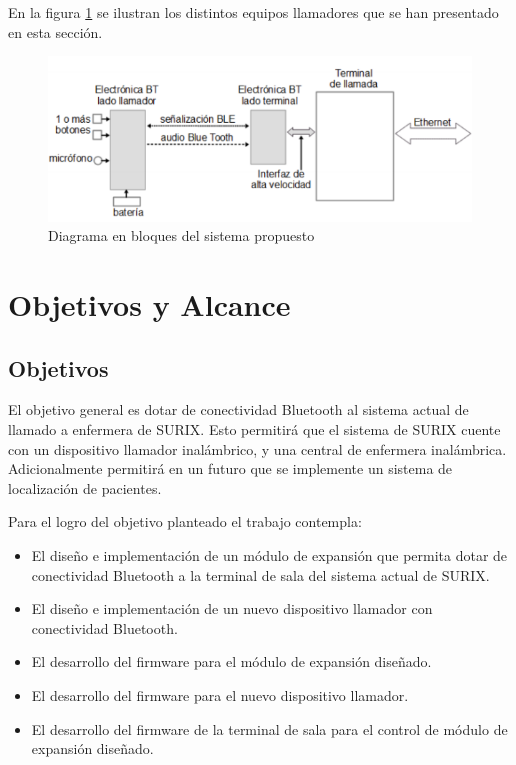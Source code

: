 En la figura \ref{fig:sistemasDeLLamadoactuales} se ilustran los distintos equipos llamadores que se han presentado en esta sección.

\begin{figure}[htpb]
	\centering
	\includegraphics[scale=0.5]{./Figures/DiagramaDeBloques.png}
	\caption{Diagrama en bloques del sistema propuesto}
	\label{fig:sistemasDeLLamadoactuales}
\end{figure}



\section{Objetivos y Alcance}

\subsection{Objetivos}

El objetivo general es dotar de conectividad Bluetooth al sistema actual de llamado a enfermera de SURIX. Esto permitirá que el sistema de SURIX cuente con un dispositivo llamador inalámbrico, y una central de enfermera inalámbrica. Adicionalmente permitirá en un futuro que se implemente un sistema de localización de pacientes.

Para el logro del objetivo planteado el trabajo contempla:

\begin{itemize}

\item El diseño e implementación de un módulo de expansión que permita dotar de conectividad Bluetooth a la terminal de sala del sistema actual de SURIX.

\item El diseño e implementación de un nuevo dispositivo llamador con conectividad Bluetooth.

\item El desarrollo del firmware para el módulo de expansión diseñado.

\item El desarrollo del firmware para el nuevo dispositivo llamador.

\item El desarrollo del firmware de la terminal de sala para el control de módulo de expansión diseñado.

\end{itemize}

